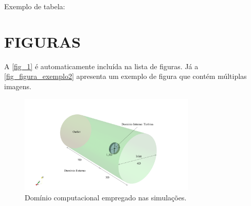 \begin{apendicesenv}
    Exemplo de tabela:

    

    \section{FIGURAS}

    A \autoref{fig_1} é automaticamente incluída na lista de figuras. Já a \autoref{fig_figura_exemplo2} apresenta um exemplo de figura que contém múltiplas imagens.

    \begin{figure}[!htb]
        \centering
        \caption{Domínio computacional empregado nas simulações.}
        \label{fig_1}
        \includegraphics[width=0.75\textwidth]{figuras/domain.png}
    \end{figure}


\end{apendicesenv}

